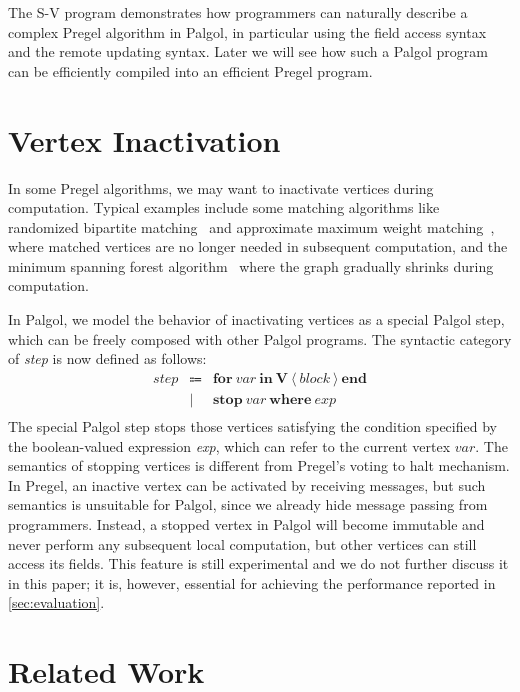 \documentclass{sokendai_thesis} %
\begin{document}
The S-V program demonstrates how programmers can naturally describe a complex Pregel algorithm in Palgol, in particular using the field access syntax and the remote updating syntax.
Later we will see how such a Palgol program can be efficiently compiled into an efficient Pregel program.

\section{Vertex Inactivation}

In some Pregel algorithms, we may want to inactivate vertices during computation.
Typical examples include some matching algorithms like randomized bipartite matching~\cite{pregel} and approximate maximum weight matching~\cite{optimizing}, where matched vertices are no longer needed in subsequent computation, and the minimum spanning forest algorithm~\cite{optimizing} where the graph gradually shrinks during computation.

In Palgol, we model the behavior of inactivating vertices as a special Palgol step, which can be freely composed with other Palgol programs.
The syntactic category of \textit{step} is now defined as follows:
\[
\begin{array}{lcl}
\mathit{step} & \Coloneqq & \mathbf{for}~\mathit{var}~\mathbf{in}~\mathbf{V}~\langle~\mathit{block}~\rangle~\mathbf{end} \\
 & | & \mathbf{stop}~\mathit{var}~\mathbf{where}~\mathit{exp} \\
\end{array}
\]
The special Palgol step stops those vertices satisfying the condition specified by the boolean-valued expression \textit{exp}, which can refer to the current vertex $\mathit{var}$.
The semantics of stopping vertices is different from Pregel's voting to halt mechanism.
In Pregel, an inactive vertex can be activated by receiving messages, but such semantics is unsuitable for Palgol, since we already hide message passing from programmers.
Instead, a stopped vertex in Palgol will become immutable and never perform any subsequent local computation, but other vertices can still access its fields.
This feature is still experimental and we do not further discuss it in this paper; it is, however, essential for achieving the performance reported in \autoref{sec:evaluation}.

\section{Related Work}
\end{document}
